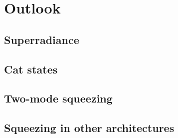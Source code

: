 \section{Outlook}


\subsection{Superradiance}

\subsection{Cat states}

\subsection{Two-mode squeezing}


\subsection{Squeezing in other architectures}

